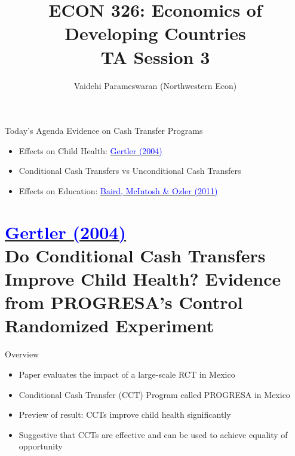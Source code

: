 \documentclass[11pt,notes=hide,aspectratio=169,mathserif]{beamer}
\title[class]{ECON 326: Economics of Developing Countries \\ TA Session 3}
\author[vaidehi's class ]{Vaidehi Parameswaran (Northwestern Econ)}
\date{\monthname[\the\month] \the\year}
\begin{document}
\begin{frame}[plain]
\titlepage
\end{frame}


\begin{frame}{Today's Agenda}
Evidence on Cash Transfer Programs
\begin{itemize}
\item Effects on Child Health: \href{https://www.aeaweb.org/articles?id=10.1257/0002828041302109}{\textcolor{blue}{Gertler (2004)}}
\item Conditional Cash Transfers vs Unconditional Cash Transfers
\item Effects on Education: \href{https://academic.oup.com/qje/article-abstract/126/4/1709/1922509?login=false}{\textcolor{blue}{Baird, McIntosh \& Ozler (2011)}}
\end{itemize}
\end{frame}



\section*{\href{https://www.aeaweb.org/articles?id=10.1257/0002828041302109}{\textcolor{blue}{Gertler (2004)}} \\[5mm] 
\textnormal{\small{Do Conditional Cash Transfers Improve Child Health? Evidence from PROGRESA's Control Randomized Experiment}}}

\begin{frame}{Overview}
\begin{itemize}
\item Paper evaluates the impact of a large-scale RCT in Mexico 
\item Conditional Cash Transfer (CCT) Program called PROGRESA in Mexico
\item Preview of result: CCTs improve child health significantly 
\item Suggestive that CCTs are effective and can be used to achieve equality of opportunity 
\end{itemize}
\end{frame}
\end{document}
